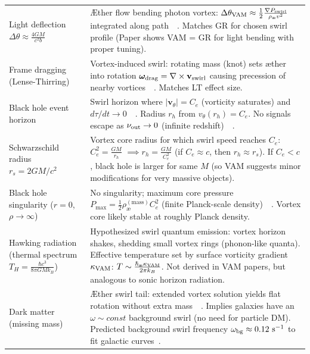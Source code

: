 \documentclass[preprint]{revtex4-2}
\begin{document}
\begin{table}[H]
\begin{tabular}{p{} | p{}}
            Light deflection $\Delta\theta \approx \frac{4GM}{c^2 b}$ & Æther flow bending photon vortex: $\Delta \theta_{\rm VAM} \approx \frac{1}{2} \frac{\nabla P_{\rm swirl}}{\rho_{\text{\ae}} v^2}$ integrated along path~\cite{reference_218}~\cite{reference_219}. Matches GR for chosen swirl profile (Paper shows VAM = GR for light bending with proper tuning). \\
            Frame dragging (Lense-Thirring) & Vortex-induced swirl: rotating mass (knot) sets æther into rotation $\boldsymbol{\omega}_{\rm drag} = \nabla \times \mathbf{v}_{\rm swirl}$ causing precession of nearby vortices~\cite{reference_220}~\cite{reference_221}. Matches LT effect size. \\
            Black hole event horizon & Swirl horizon where $|\mathbf{v}_\theta| = C_e$ (vorticity saturates) and $d\tau/dt \to 0$~\cite{reference_222}~\cite{reference_223}. Radius $r_h$ from $v_\theta(r_h)=C_e$. No signals escape as $\nu_{\rm out}\to 0$ (infinite redshift)~\cite{reference_224}~\cite{reference_225}. \\
            Schwarzschild radius $r_s = 2GM/c^2$ & Vortex core radius for which swirl speed reaches $C_e$: $C_e^2 = \frac{GM}{r_h}$ $\implies r_h = \frac{GM}{C_e^2}$ (if $C_e \approx c$, then $r_h \approx r_s$). If $C_e < c$, black hole is larger for same $M$ (so VAM suggests minor modifications for very massive objects). \\
            Black hole singularity ($r=0$, $\rho\to\infty$) & No singularity; maximum core pressure $P_{\max} = \frac{1}{2}\rho_{\text{\ae}}^{(\text{mass})}C_e^2$ (finite Planck-scale density)~\cite{reference_226}~\cite{reference_227}. Vortex core likely stable at roughly Planck density. \\
            Hawking radiation (thermal spectrum $T_H = \frac{\hbar c^3}{8\pi GMk_B}$) & Hypothesized swirl quantum emission: vortex horizon shakes, shedding small vortex rings (phonon-like quanta). Effective temperature set by surface vorticity gradient $\kappa_{\rm VAM}$: $T \sim \frac{\hbar_{\text{\ae}}\kappa_{\rm VAM}}{2\pi k_B}$. Not derived in VAM papers, but analogous to sonic horizon radiation. \\
            Dark matter (missing mass) & Æther swirl tail: extended vortex solution yields flat rotation without extra mass~\cite{reference_228}~\cite{reference_229}. Implies galaxies have an $\omega \sim const$ background swirl (no need for particle DM). Predicted background swirl frequency $\omega_{\rm bg}\approx 0.12~\text{s}^{-1}$ to fit galactic curves~\cite{reference_230}. \\

\end{tabular}
\end{table}
\end{document}
